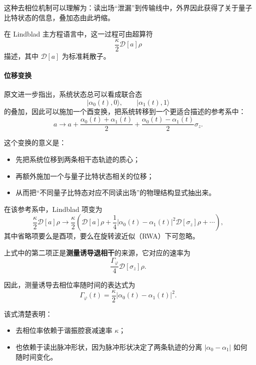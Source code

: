 \documentclass[12pt,a4paper,oneside]{ctexbook}
\begin{document}
这种去相位机制可以理解为：读出场“泄漏”到传输线中，外界因此获得了关于量子比特状态的信息，叠加态由此坍缩。

在 Lindblad 主方程语言中，这一过程可由超算符
\[
\frac{\kappa}{2}\mathcal{D}[a]\rho
\]
描述，其中 \(\mathcal{D}[a]\) 为标准耗散子。

\paragraph{位移变换}
原文进一步指出，系统状态总可以看成联合态
\[
|\alpha_0(t),0\rangle,\qquad |\alpha_1(t),1\rangle
\]
的叠加，因此可以施加一个酉变换，把系统转移到一个更适合描述的参考系中：
\begin{equation}
a
\rightarrow
a+\frac{\alpha_0(t)+\alpha_1(t)}{2}
+\frac{\alpha_0(t)-\alpha_1(t)}{2}\sigma_z.
\tag{57}
\end{equation}

这个变换的意义是：
\begin{itemize}
    \item 先把系统位移到两条相干态轨迹的质心；
    \item 再额外施加一个与量子比特状态相关的位移；
    \item 从而把“不同量子比特态对应不同读出场”的物理结构显式抽出来。
\end{itemize}

在该参考系中，Lindblad 项变为
\begin{equation}
\frac{\kappa}{2}\mathcal{D}[a]\rho
\rightarrow
\frac{\kappa}{2}\left(
\mathcal{D}[a]\rho
+\frac{1}{4}|\alpha_0(t)-\alpha_1(t)|^2\mathcal{D}[\sigma_z]\rho
+\cdots
\right),
\tag{58}
\end{equation}
其中省略项要么是酉项，要么在旋转波近似（RWA）下可忽略。

上式中的第二项正是\textbf{测量诱导退相干}的来源，它对应的速率为
\[
\frac{\Gamma_\varphi}{4}\mathcal{D}[\sigma_z]\rho.
\]

因此，测量诱导去相位率随时间的表达式为
\begin{equation}
\Gamma_\varphi(t)=\frac{\kappa}{2}|\alpha_0(t)-\alpha_1(t)|^2.
\tag{59}
\end{equation}

该式清楚表明：
\begin{itemize}
    \item 去相位率依赖于谐振腔衰减速率 \(\kappa\)；
    \item 也依赖于读出脉冲形状，因为脉冲形状决定了两条轨迹的分离 \(|\alpha_0-\alpha_1|\) 如何随时间变化。
\end{itemize}
\end{document}
